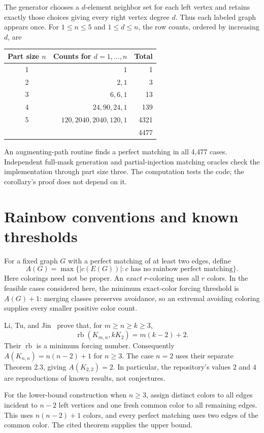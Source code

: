 \documentclass[11pt,letterpaper]{article}
\begin{document}
The generator chooses a $d$-element neighbor set for each left vertex and
retains exactly those choices giving every right vertex degree $d$. Thus each
labeled graph appears once. For $1\le n\le5$ and $1\le d\le n$, the row
counts, ordered by increasing $d$, are
\begin{center}
\begin{tabular}{crr}
\toprule
Part size $n$ & Counts for $d=1,\ldots,n$ & Total\\
\midrule
1 & $1$ & 1\\
2 & $2,1$ & 3\\
3 & $6,6,1$ & 13\\
4 & $24,90,24,1$ & 139\\
5 & $120,2040,2040,120,1$ & 4321\\
\midrule
 & & 4477\\
\bottomrule
\end{tabular}
\end{center}
An augmenting-path routine finds a perfect matching in all 4,477 cases.
Independent full-mask generation and partial-injection matching oracles check
the implementation through part size three. The computation tests the code;
the corollary's proof does not depend on it.

\section{Rainbow conventions and known thresholds}
For a fixed graph $G$ with a perfect matching of at least two edges, define
\[
 A(G)=\max\{|c(E(G))|:\text{$c$ has no rainbow perfect matching}\}.
\]
Here colorings need not be proper. An \emph{exact} $r$-coloring uses all $r$
colors. In the feasible cases considered here, the minimum exact-color
forcing threshold is $A(G)+1$: merging classes preserves avoidance, so an
extremal avoiding coloring supplies every smaller positive color count.

Li, Tu, and Jin~\cite[Theorem 2.5]{LTJ} prove that, for $m\ge n\ge k\ge3$,
\[
 \operatorname{rb}(K_{m,n},kK_2)=m(k-2)+2.
\]
Their $\operatorname{rb}$ is a minimum forcing number. Consequently
$A(K_{n,n})=n(n-2)+1$ for $n\ge3$. The case $n=2$ uses their separate
Theorem 2.3, giving $A(K_{2,2})=2$. In particular, the repository's values
$2$ and $4$ are reproductions of known results, not conjectures.

For the lower-bound construction when $n\ge3$, assign distinct colors to all
edges incident to $n-2$ left vertices and one fresh common color to all
remaining edges. This uses $n(n-2)+1$ colors, and every perfect matching uses
two edges of the common color. The cited theorem supplies the upper bound.
\end{document}
